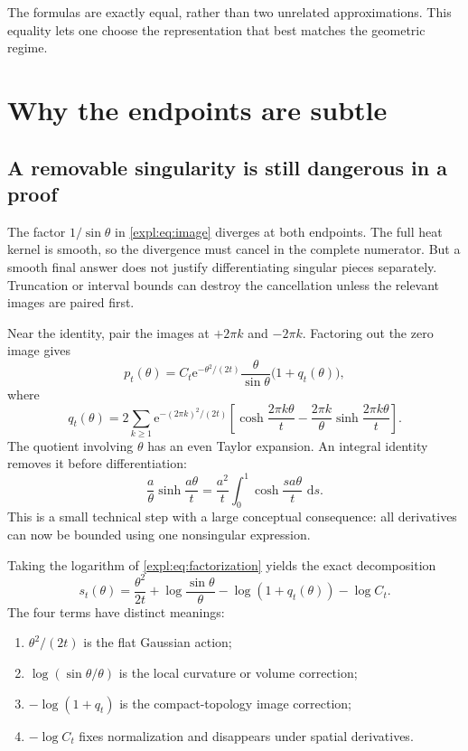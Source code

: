 \documentclass[11pt]{article}
\theoremstyle{definition}
\newcommand{\dd}{\,\mathrm{d}}
\newcommand{\e}{\mathrm{e}}
\begin{document}
The formulas are exactly equal, rather than two unrelated approximations.
This equality lets one choose the representation that best matches the
geometric regime.

\section{Why the endpoints are subtle}

\subsection{A removable singularity is still dangerous in a proof}

The factor $1/\sin\theta$ in \eqref{expl:eq:image} diverges at both endpoints.
The full heat kernel is smooth, so the divergence must cancel in the complete
numerator.  But a smooth final answer does not justify differentiating
singular pieces separately.  Truncation or interval bounds can destroy the
cancellation unless the relevant images are paired first.

Near the identity, pair the images at $+2\pi k$ and $-2\pi k$.  Factoring out
the zero image gives
\begin{equation}\label{expl:eq:factorization}
 p_t(\theta)=C_t\e^{-\theta^2/(2t)}
 \frac{\theta}{\sin\theta}\bigl(1+q_t(\theta)\bigr),
\end{equation}
where
\begin{equation}\label{expl:eq:q}
 q_t(\theta)=2\sum_{k\ge1}\e^{-(2\pi k)^2/(2t)}
 \left[
 \cosh\frac{2\pi k\theta}{t}
 -\frac{2\pi k}{\theta}\sinh\frac{2\pi k\theta}{t}
 \right].
\end{equation}
The quotient involving $\theta$ has an even Taylor expansion.  An integral
identity removes it before differentiation:
\begin{equation}\label{expl:eq:sinh-integral}
 \frac{a}{\theta}\sinh\frac{a\theta}{t}
 =\frac{a^2}{t}\int_0^1\cosh\frac{sa\theta}{t}\,\dd s.
\end{equation}
This is a small technical step with a large conceptual consequence: all
derivatives can now be bounded using one nonsingular expression.

Taking the logarithm of \eqref{expl:eq:factorization} yields the exact
decomposition
\begin{equation}\label{expl:eq:action-decomposition}
 s_t(\theta)=\frac{\theta^2}{2t}
 +\log\frac{\sin\theta}{\theta}
 -\log(1+q_t(\theta))-\log C_t.
\end{equation}
The four terms have distinct meanings:
\begin{enumerate}[label=(\roman*)]
\item $\theta^2/(2t)$ is the flat Gaussian action;
\item $\log(\sin\theta/\theta)$ is the local curvature or volume correction;
\item $-\log(1+q_t)$ is the compact-topology image correction;
\item $-\log C_t$ fixes normalization and disappears under spatial derivatives.
\end{enumerate}
\end{document}
